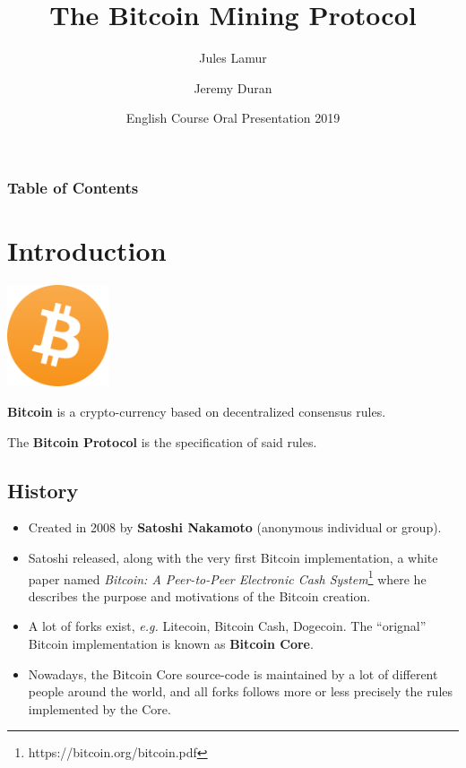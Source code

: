 \documentclass{beamer}
\title{The Bitcoin Mining Protocol}
\author[Lamur, Duran]{Jules Lamur\inst{1} \and Jeremy Duran\inst{1}}
\institute
{
    \inst{1}
    Université de Toulouse 3 --- Paul Sabatier
}
\date[2019]{English Course Oral Presentation 2019}
\begin{document}
\frame{\titlepage}

\begin{frame}
    \frametitle{Table of Contents}
    \tableofcontents[hidesubsections]
\end{frame}

\section{Introduction}

\begin{frame}
    \begin{center}
        \includegraphics[height=3cm]{bitcoin_logo.png}
    \end{center}

    \textbf{Bitcoin} is a crypto-currency based on decentralized consensus rules.
    \pause

    The \textbf{Bitcoin Protocol} is the specification of said rules.
\end{frame}

\subsection{History}

\begin{frame}
    \begin{itemize}
        \item Created in 2008 by \textbf{Satoshi Nakamoto} (anonymous
            individual or group).

        \item Satoshi released, along with the very first Bitcoin
            implementation, a white paper named \textit{Bitcoin: A Peer-to-Peer
            Electronic Cash System}\footnote{https://bitcoin.org/bitcoin.pdf}
            where he describes the purpose and motivations of the Bitcoin
            creation.

        \item A lot of forks exist, \textit{e.g.} Litecoin, Bitcoin Cash,
            Dogecoin. The ``orignal'' Bitcoin implementation is known as
            \textbf{Bitcoin Core}.

        \item Nowadays, the Bitcoin Core source-code is maintained by a lot of
            different people around the world, and all forks follows more or
            less precisely the rules implemented by the Core.
    \end{itemize}
\end{frame}
\end{document}
